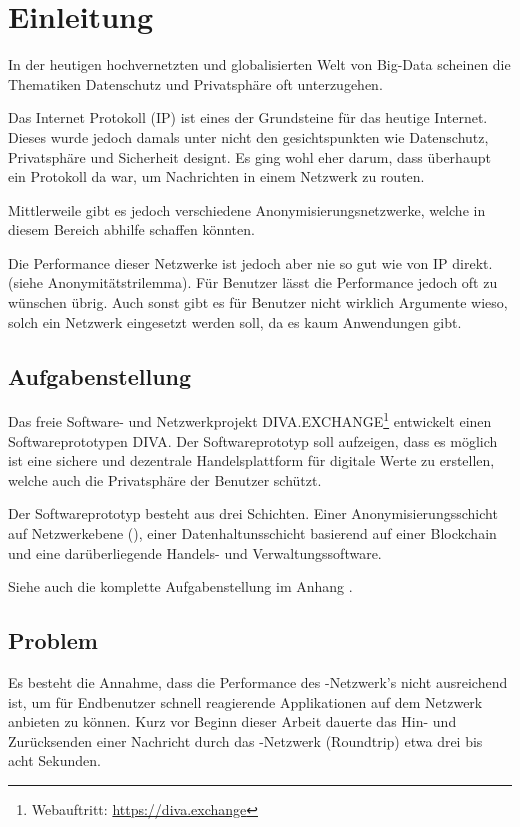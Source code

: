 \chapter{Einleitung}
\label{ch:Einleitung}

In der heutigen hochvernetzten und globalisierten Welt von Big-Data scheinen die Thematiken Datenschutz und Privatsphäre oft unterzugehen.

Das Internet Protokoll (IP) ist eines der Grundsteine für das heutige Internet.
Dieses wurde jedoch damals unter nicht den gesichtspunkten wie Datenschutz, Privatsphäre und Sicherheit designt.
Es ging wohl eher darum, dass überhaupt ein Protokoll da war, um Nachrichten in einem Netzwerk zu routen.

Mittlerweile gibt es jedoch verschiedene Anonymisierungsnetzwerke, welche in diesem Bereich abhilfe schaffen könnten.

Die Performance dieser Netzwerke ist jedoch aber nie so gut wie von IP direkt. (siehe Anonymitätstrilemma).
Für Benutzer lässt die Performance jedoch oft zu wünschen übrig.
Auch sonst gibt es für Benutzer nicht wirklich Argumente wieso, solch ein Netzwerk eingesetzt werden soll, da es kaum Anwendungen gibt.


\section{Aufgabenstellung}

Das freie Software- und Netzwerkprojekt DIVA.EXCHANGE\footnote{Webauftritt: \url{https://diva.exchange}} entwickelt einen Softwareprototypen DIVA.
Der Softwareprototyp soll aufzeigen, dass es möglich ist eine sichere und dezentrale Handelsplattform für digitale Werte zu erstellen, welche auch die Privatsphäre der Benutzer schützt.

Der Softwareprototyp besteht aus drei Schichten.
Einer Anonymisierungsschicht auf Netzwerkebene (), einer Datenhaltunsschicht basierend auf einer Blockchain und eine darüberliegende Handels- und Verwaltungssoftware.

Siehe auch die komplette Aufgabenstellung im Anhang .

\section{Problem}

Es besteht die Annahme, dass die Performance des -Netzwerk's nicht ausreichend ist, um für Endbenutzer schnell reagierende Applikationen auf dem Netzwerk anbieten zu können.
Kurz vor Beginn dieser Arbeit dauerte das Hin- und Zurücksenden einer Nachricht durch das -Netzwerk (Roundtrip) etwa drei bis acht Sekunden.

